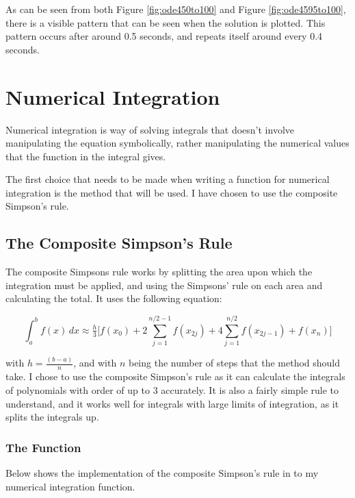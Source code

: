 \documentclass[a4paper]{article}
\begin{document}
As can be seen from both Figure \ref{fig:ode450to100} and Figure \ref{fig:ode4595to100}, there is a visible pattern that can be seen when the solution is plotted. This pattern occurs after around 0.5 seconds, and repeats itself around every 0.4 seconds. 

\section{Numerical Integration}

Numerical integration is way of solving integrals that doesn't involve manipulating the equation symbolically, rather manipulating the numerical values that the function in the integral gives.

The first choice that needs to be made when writing a function for numerical integration is the method that will be used. I have chosen to use the composite Simpson's rule. 

\subsection{The Composite Simpson's Rule}



The composite Simpsons rule works by splitting the area upon which the integration must be applied, and using the Simpsons' rule on each area and calculating the total. It uses the following equation:

$$\int_a^b f(x) \, dx\approx\tfrac{h}{3}\bigg[f(x_0)+2\sum_{j=1}^{n/2-1}f(x_{2j})+
4\sum_{j=1}^{n/2}f(x_{2j-1})+f(x_n)\bigg]$$

with $h = \frac{(b-a)}{n}$, and with $n$ being the number of steps that the method should take. 
I chose to use the composite Simpson's rule as it can calculate the integrals of polynomials with order of up to 3 accurately. It is also a fairly simple rule to understand, and it works well for integrals with large limits of integration, as it splits the integrals up. 


\subsubsection{The Function}
Below shows the implementation of the composite Simpson's rule in to my numerical integration function. 
\end{document}
